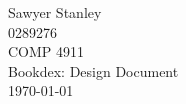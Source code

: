 \documentclass{article}
\newcommand{\class}{COMP 4911}
\newcommand{\examnum}{Bookdex: Design Document}
\newcommand{\examdate}{\today}
\newcommand{\yourname}{Sawyer Stanley}
\newcommand{\studentid}{0289276}
\begin{document}
\pagestyle{plain}

\vspace*{\fill}
\begin{center}
    \yourname\\
    \studentid\\
    \class\\
    \examnum\\
    \examdate\\
\end{center}
\vspace*{\fill}

\thispagestyle{empty}
\newpage

\tableofcontents
\newpage















\end{document}
